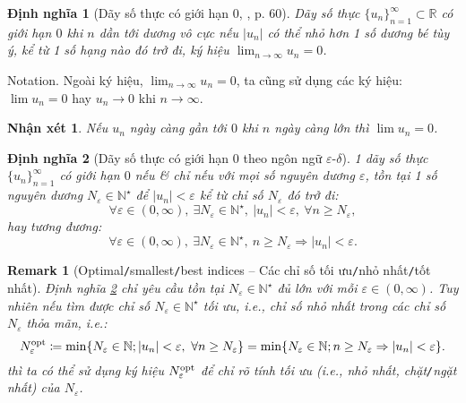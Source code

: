 \documentclass[oneside]{book}
\newtheorem{dinhnghia}{Định nghĩa}
\newtheorem{nhanxet}{Nhận xét}
\newtheorem{remark}{Remark}
\begin{document}
\begin{dinhnghia}[Dãy số thực có giới hạn $0$,  \cite{SGK_Toan_11_CD_tap_1}, p. 60]
	\label{def: sequence lim 0}
	Dãy số thực $\{u_n\}_{n=1}^\infty\subset\mathbb{R}$ có giới hạn $0$ khi $n$ dần tới dương vô cực nếu $|u_n|$ có thể nhỏ hơn 1 số dương bé tùy ý, kể từ 1 số hạng nào đó trở đi, ký hiệu $\lim_{n\to\infty} u_n = 0$.
\end{dinhnghia}
{\sf Notation.} Ngoài ký hiệu, $\lim_{n\to\infty} u_n = 0$, ta cũng sử dụng các ký hiệu: $\lim u_n = 0$ hay $u_n\to0$ khi $n\to\infty$.

\begin{nhanxet}
	Nếu $u_n$ ngày càng gần tới $0$ khi $n$ ngày càng lớn thì $\lim u_n = 0$.
\end{nhanxet}

\begin{dinhnghia}[Dãy số thực có giới hạn $0$ theo ngôn ngữ $\varepsilon$-$\delta$]
	\label{def: sequence lim 0: epsilon-delta}
	1 dãy số thực $\{u_n\}_{n=1}^\infty$ có giới hạn $0$ nếu \& chỉ nếu với mọi số nguyên dương $\varepsilon$, tồn tại 1 số nguyên dương $N_\varepsilon\in\mathbb{N}^\star$ để $|u_n| < \varepsilon$ kể từ chỉ số $N_\varepsilon$ đó trở đi:	
	\begin{equation*}
		\forall\varepsilon\in(0,\infty),\ \exists N_\varepsilon\in\mathbb{N}^\star,\ |u_n| < \varepsilon,\ \forall n\ge N_\varepsilon,
	\end{equation*}
	hay tương đương:
	\begin{equation*}
		\forall\varepsilon\in(0,\infty),\ \exists N_\varepsilon\in\mathbb{N}^\star,\ n\ge N_\varepsilon\Rightarrow|u_n| < \varepsilon.
	\end{equation*}
\end{dinhnghia}

\begin{remark}[Optimal{\tt/}smallest{\tt/}best indices -- Các chỉ số tối ưu{\tt/}nhỏ nhất{\tt/}tốt nhất]
	Định nghĩa \ref{def: sequence lim 0: epsilon-delta} chỉ yêu cầu tồn tại $N_\varepsilon\in\mathbb{N}^\star$ đủ lớn với mỗi $\varepsilon\in(0,\infty)$. Tuy nhiên nếu tìm được chỉ số $N_\varepsilon\in\mathbb{N}^\star$ tối ưu, i.e., chỉ số nhỏ nhất trong các chỉ số $N_\varepsilon$ thỏa mãn, i.e.:
	\begin{equation*}
		N_\varepsilon^{\rm opt}\coloneqq\min\{N_\varepsilon\in\mathbb{N};|u_n| < \varepsilon,\ \forall n\ge N_\varepsilon\} = \min\{N_\varepsilon\in\mathbb{N};n\ge N_\varepsilon\Rightarrow|u_n| < \varepsilon\}.
	\end{equation*}
	thì ta có thể sử dụng ký hiệu $N_\varepsilon^{\rm opt}$ để chỉ rõ tính tối ưu (i.e., nhỏ nhất, chặt{\tt/}ngặt nhất) của $N_\varepsilon$.
\end{remark}
\end{document}
